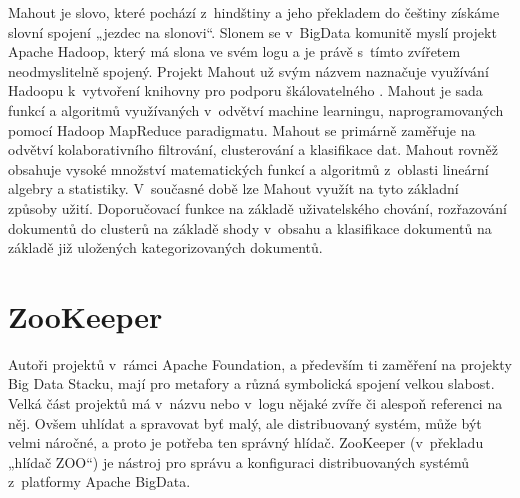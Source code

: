 Mahout je slovo, které pochází z~hindštiny a jeho překladem do češtiny získáme slovní spojení „jezdec na slonovi“. Slonem se v~BigData komunitě myslí projekt Apache Hadoop, který má slona ve svém logu a je právě s~tímto zvířetem neodmyslitelně spojený. Projekt Mahout už svým názvem naznačuje využívání Hadoopu k~vytvoření knihovny pro podporu škálovatelného . Mahout je sada funkcí a algoritmů využívaných v~odvětví machine learningu, naprogramovaných pomocí Hadoop MapReduce paradigmatu. Mahout se primárně zaměřuje na odvětví kolaborativního filtrování, clusterování a klasifikace dat. Mahout rovněž obsahuje vysoké množství matematických funkcí a algoritmů z~oblasti lineární algebry a statistiky. V~současné době lze Mahout využít na tyto základní způsoby užití. Doporučovací funkce na základě uživatelského chování, rozřazování dokumentů do clusterů na základě shody v~obsahu a klasifikace dokumentů na základě již uložených kategorizovaných dokumentů. %

\section {ZooKeeper}

Autoři projektů v~rámci Apache Foundation, a především ti zaměření na projekty Big Data Stacku, mají pro metafory a různá symbolická spojení velkou slabost. Velká část projektů má v~názvu nebo v~logu nějaké zvíře či alespoň referenci na něj. Ovšem uhlídat a spravovat byť malý, ale distribuovaný systém, může být velmi náročné, a proto je potřeba ten správný hlídač. ZooKeeper (v~překladu „hlídač ZOO“) je nástroj pro správu a konfiguraci distribuovaných systémů z~platformy Apache BigData. 

